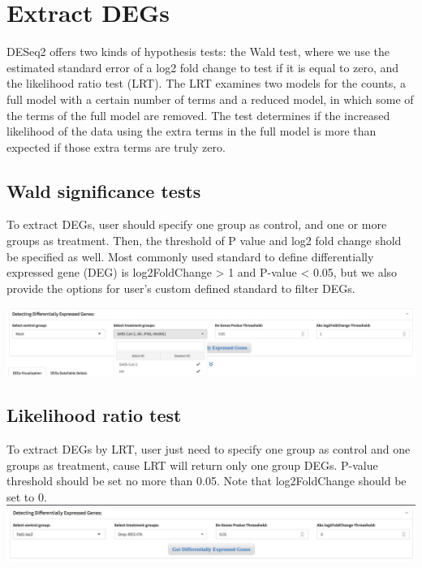 \documentclass[
  a4paper,
  oneside]{book}
\begin{document}
\hypertarget{extract-degs}{%
\section{Extract DEGs}\label{extract-degs}}

DESeq2 offers two kinds of hypothesis tests: the Wald test, where we use the estimated standard error of a log2 fold change to test if it is equal to zero, and the likelihood ratio test (LRT). The LRT examines two models for the counts, a full model with a certain number of terms and a reduced model, in which some of the terms of the full model are removed. The test determines if the increased likelihood of the data using the extra terms in the full model is more than expected if those extra terms are truly zero.

\hypertarget{wald-significance-tests}{%
\subsection{Wald significance tests}\label{wald-significance-tests}}

To extract DEGs, user should specify one group as control, and one or more groups as treatment. Then, the threshold of P value and log2 fold change shold be specified as well. Most commonly used standard to define differentially expressed gene (DEG) is \textbar log2FoldChange\textbar{} \textgreater{} 1 and P-value \textless{} 0.05, but we also provide the options for user's custom defined standard to filter DEGs.

\includegraphics{images/dea-de.jpeg}

\hypertarget{likelihood-ratio-test}{%
\subsection{Likelihood ratio test}\label{likelihood-ratio-test}}

To extract DEGs by LRT, user just need to specify one group as control and one groups as treatment, cause LRT will return only one group DEGs. P-value threshold should be set no more than 0.05. Note that log2FoldChange should be set to 0.
\includegraphics{images/dea-de-lrt.jpeg}
\end{document}
